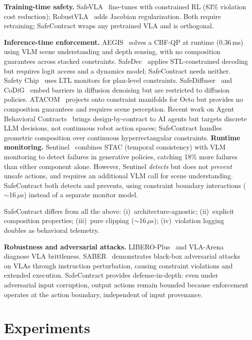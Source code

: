 \documentclass[conference]{IEEEtran}
\begin{document}
\textbf{Training-time safety.}
SafeVLA~\cite{safevla} fine-tunes with constrained RL (83\% violation cost reduction); RobustVLA~\cite{robustvla} adds Jacobian regularization.
Both require retraining; SafeContract wraps any pretrained VLA and is orthogonal.

\textbf{Inference-time enforcement.}
AEGIS~\cite{aegis} solves a CBF-QP at runtime (0.36\,ms) using VLM scene understanding and depth sensing, with no composition guarantees across stacked constraints.
SafeDec~\cite{safedec} applies STL-constrained decoding but requires logit access and a dynamics model; SafeContract needs neither.
Safety Chip~\cite{safetychip} uses LTL monitors for plan-level constraints.
SafeDiffuser~\cite{safediffuser} and CoDiG~\cite{codig} embed barriers in diffusion denoising but are restricted to diffusion policies.
ATACOM~\cite{atacom} projects onto constraint manifolds for Octo but provides no composition guarantees and requires scene perception.
Recent work on Agent Behavioral Contracts~\cite{abc} brings design-by-contract to AI agents but targets discrete LLM decisions, not continuous robot action spaces; SafeContract handles geometric composition over continuous hyperrectangular constraints.
\textbf{Runtime monitoring.}
Sentinel~\cite{sentinel} combines STAC (temporal consistency) with VLM monitoring to detect failures in generative policies, catching 18\% more failures than either component alone.
However, Sentinel \emph{detects} but does not \emph{prevent} unsafe actions, and requires an additional VLM call for scene understanding.
SafeContract both detects and prevents, using constraint boundary interactions (${\sim}$16\,$\mu$s) instead of a separate monitor model.

SafeContract differs from all the above: (i)~architecture-agnostic; (ii)~explicit composition properties; (iii)~pure clipping (${\sim}$16\,$\mu$s); (iv)~violation logging doubles as behavioral telemetry.

\textbf{Robustness and adversarial attacks.}
LIBERO-Plus~\cite{liberoplus} and VLA-Arena~\cite{vlaarena} diagnose VLA brittleness.
SABER~\cite{saber} demonstrates black-box adversarial attacks on VLAs through instruction perturbation, causing constraint violations and extended execution.
SafeContract provides defense-in-depth: even under adversarial input corruption, output actions remain bounded because enforcement operates at the action boundary, independent of input provenance.

\section{Experiments}
\end{document}
